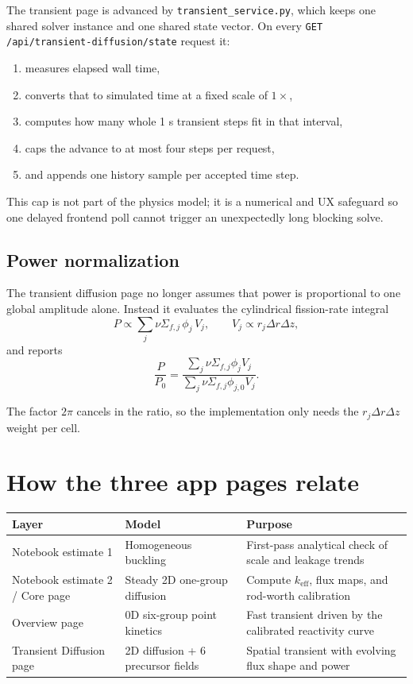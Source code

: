 \documentclass[11pt]{article}
\begin{document}
The transient page is advanced by \texttt{transient\_service.py}, which keeps one
shared solver instance and one shared state vector.  On every
\texttt{GET /api/transient-diffusion/state} request it:
\begin{enumerate}
  \item measures elapsed wall time,
  \item converts that to simulated time at a fixed scale of $1\times$,
  \item computes how many whole 1 s transient steps fit in that interval,
  \item caps the advance to at most four steps per request,
  \item and appends one history sample per accepted time step.
\end{enumerate}

This cap is not part of the physics model; it is a numerical and UX safeguard so
one delayed frontend poll cannot trigger an unexpectedly long blocking solve.

\subsection{Power normalization}

The transient diffusion page no longer assumes that power is proportional to one
global amplitude alone.  Instead it evaluates the cylindrical fission-rate
integral
\[
P \propto \sum_j \nu\Sigma_{f,j}\,\phi_j\,V_j,
\qquad
V_j \propto r_j \Delta r \Delta z,
\]
and reports
\[
\frac{P}{P_0}
=
\frac{\sum_j \nu\Sigma_{f,j}\phi_j V_j}
{\sum_j \nu\Sigma_{f,j}\phi_{j,0} V_j}.
\]

The factor $2\pi$ cancels in the ratio, so the implementation only needs the
$r_j \Delta r \Delta z$ weight per cell.

\section{How the three app pages relate}

\begin{center}
\begin{tabular}{p{2.6cm}p{3.8cm}p{6.1cm}}
\toprule
Layer & Model & Purpose \\
\midrule
Notebook estimate 1 & Homogeneous buckling & First-pass analytical check of scale and leakage trends \\
Notebook estimate 2 / Core page & Steady 2D one-group diffusion & Compute $k_{\mathrm{eff}}$, flux maps, and rod-worth calibration \\
Overview page & 0D six-group point kinetics & Fast transient driven by the calibrated reactivity curve \\
Transient Diffusion page & 2D diffusion + 6 precursor fields & Spatial transient with evolving flux shape and power \\
\bottomrule
\end{tabular}
\end{center}
\end{document}
